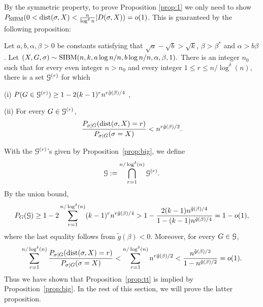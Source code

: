 \documentclass{article}
\begin{document}
By the symmetric property, to prove Proposition \ref{prop:1}
we only need to show $P_{\operatorname{SIBM}}( 0 <\operatorname{dist}(\sigma, X) < \frac{n}{\log^{\delta} n} | D(\sigma, X))=o(1) $.
This is guaranteed by the following proposition:
\begin{proposition} \label{prop:big}
Let $a,b,\alpha,\beta> 0$ be constants satisfying that $\sqrt{a}-\sqrt{b} > \sqrt{k}$, $\beta>\beta^\ast$ and $\alpha>b\beta$. 
Let 
$
(X,G,\sigma) \sim \operatorname{SIBM}(n,k,a\log n/n, b\log n/n,\alpha,\beta, 1) .
$
There is an integer $n_0$ such that for every even integer $n>n_0$ and  every integer $1\le r \le n/\log^{\delta}(n)$,
there is a set $\mathcal{G}^{(r)}$ for which

\noindent (i)
$P(G\in\mathcal{G}^{(r)}) \ge 1- 2(k-1)^r n^{r\tilde{g}(\beta)/4}$ ,

\noindent (ii) For every $G\in\mathcal{G}^{(r)}$,
$$
\frac{P_{\sigma|G}(\operatorname{dist}(\sigma, X)=r)}
{P_{\sigma|G}(\sigma=X)} <
n^{r \tilde{g}(\beta) /2} .
$$
\end{proposition}
With the $\mathcal{G}^{(r)}$'s given by Proposition~\ref{prop:big}, we
define 
$$
\mathcal{G}:=\bigcap_{r=1}^{n/\log^{\delta}(n)} \mathcal{G}^{(r)} .
$$
By the union bound,
$$
P_G(\mathcal{G})\ge 1-2 \sum_{r=1}^{n/\log^{\delta}(n)} (k-1)^rn^{r\tilde{g}(\beta)/4}
> 1- \frac{2 (k-1)n^{\tilde{g}(\beta)/4}}{1-(k-1)n^{\tilde{g}(\beta)/4}}
=1-o(1),
$$
where the last equality follows from $\tilde{g}(\beta)<0$. Moreover, for every $G\in\mathcal{G}$,
\begin{align*}
\sum_{r=1}^{n/\log^{\delta}(n)}
\frac{P_{\sigma|G}(\operatorname{dist}(\sigma, X) = r )}
{P_{\sigma|G}(\sigma=X)}
< \sum_{r=1}^{n/\log^{\delta}(n)}
n^{r \tilde{g}(\beta) /2}
< \frac{n^{\tilde{g}(\beta)/2}}{1-n^{\tilde{g}(\beta)/2}} =o(1) .
\end{align*}
Thus we have shown that Proposition~\ref{prop:tt} is implied by Proposition~\ref{prop:big}. In the rest of this section, we will prove the latter proposition.
\end{document}

